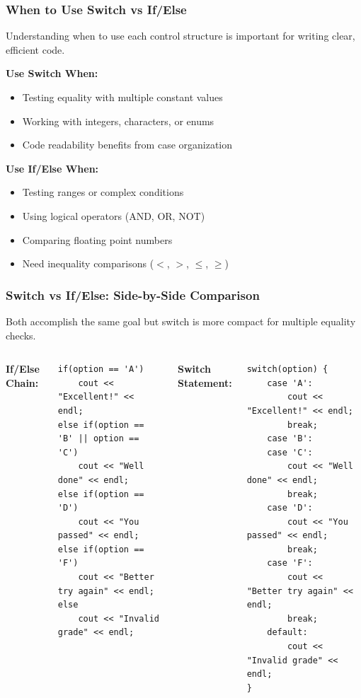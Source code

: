 \documentclass{beamer}
\begin{document}
\begin{frame}
\frametitle{When to Use Switch vs If/Else}
Understanding when to use each control structure is important for writing clear, efficient code.

\textbf{Use Switch When:}
\begin{itemize}
\item Testing equality with multiple constant values
\pause
\item Working with integers, characters, or enums
\pause
\item Code readability benefits from case organization
\end{itemize}

\pause
\textbf{Use If/Else When:}
\begin{itemize}
\item Testing ranges or complex conditions
\pause
\item Using logical operators (AND, OR, NOT)
\pause
\item Comparing floating point numbers
\pause
\item Need inequality comparisons ($<$, $>$, $\leq$, $\geq$)
\end{itemize}
\end{frame}

\begin{frame}[fragile]
\frametitle{Switch vs If/Else: Side-by-Side Comparison}
Both accomplish the same goal but switch is more compact for multiple equality checks.

\pause
\begin{columns}[t]
\textbf{If/Else Chain:}
\begin{verbatim}
if(option == 'A')
    cout << "Excellent!" << endl;
else if(option == 'B' || option == 'C')
    cout << "Well done" << endl;
else if(option == 'D')
    cout << "You passed" << endl;
else if(option == 'F')
    cout << "Better try again" << endl;
else
    cout << "Invalid grade" << endl;
\end{verbatim}

\textbf{Switch Statement:}
\begin{verbatim}
switch(option) {
    case 'A':
        cout << "Excellent!" << endl;
        break;
    case 'B':
    case 'C':
        cout << "Well done" << endl;
        break;
    case 'D':
        cout << "You passed" << endl;
        break;
    case 'F':
        cout << "Better try again" << endl;
        break;
    default:
        cout << "Invalid grade" << endl;
}
\end{verbatim}
\end{columns}
\end{frame}
\end{document}
